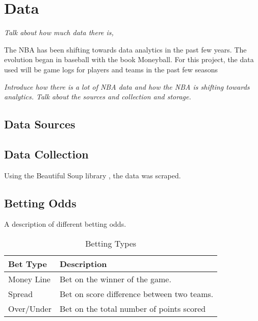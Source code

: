 \chapter{Data}\label{chapter:data}

\textit{Talk about how much data there is, }

The NBA has been shifting towards data analytics in the past few years.  The evolution began in baseball with the book Moneyball.  For this project, the data used will be game logs for players and teams in the past few seasons

\textit{Introduce how there is a lot of NBA data and how the NBA is shifting towards analytics.  Talk about the sources and collection and storage.}

\section{Data Sources}

\section{Data Collection}

Using the Beautiful Soup library \cite{beautifulsoup}, the data was scraped.

\section{Betting Odds}

A description of different betting odds.

\begin{table}[]
\centering
\begin{tabular}{|l|l|}
\hline
\textbf{Bet Type} & \textbf{Description} \\ \hline
Money Line & Bet on the winner of the game. \\ \hline
Spread & Bet on score difference between two teams. \\ \hline
Over/Under & Bet on the total number of points scored \\ \hline
\end{tabular}
\caption{Betting Types}
\label{my-label}
\end{table}